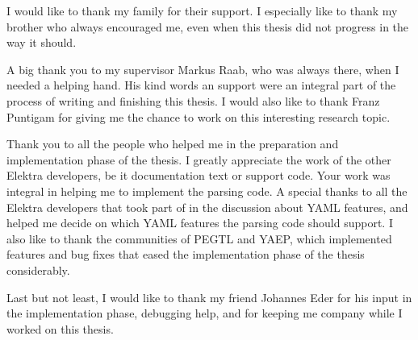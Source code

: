 \begin{acknowledgements*}
I would like to thank my family for their support. I especially like to thank my brother who always encouraged me, even when this thesis did not progress in the way it should.

A big thank you to my supervisor Markus Raab, who was always there, when I needed a helping hand. His kind words an support were an integral part of the process of writing and finishing this thesis. I would also like to thank Franz Puntigam for giving me the chance to work on this interesting research topic.

Thank you to all the people who helped me in the preparation and implementation phase of the thesis. I greatly appreciate the work of the other Elektra developers, be it documentation text or support code. Your work was integral in helping me to implement the parsing code. A special thanks to all the Elektra developers that took part of in the discussion about YAML features, and helped me decide on which YAML features the parsing code should support. I also like to thank the communities of \gls{PEGTL} and \gls{YAEP}, which implemented features and bug fixes that eased the implementation phase of the thesis considerably.

Last but not least, I would like to thank my friend Johannes Eder for his input in the implementation phase, debugging help, and for keeping me company while I worked on this thesis.
\end{acknowledgements*}
